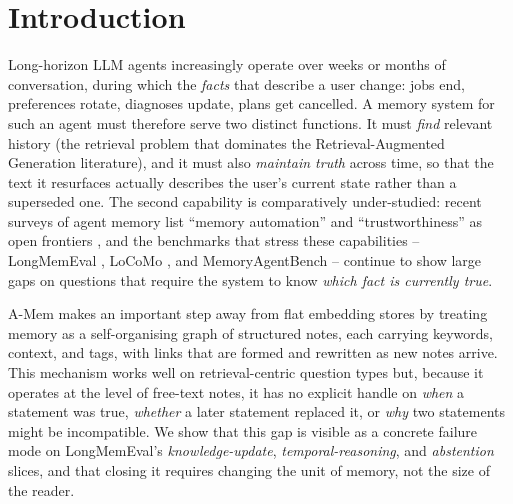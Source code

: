 \section{Introduction}
\label{sec:intro}

Long-horizon LLM agents increasingly operate over weeks or months of
conversation, during which the \emph{facts} that describe a user change:
jobs end, preferences rotate, diagnoses update, plans get cancelled.
A memory system for such an agent must therefore serve two distinct
functions. It must \emph{find} relevant history (the retrieval problem
that dominates the Retrieval-Augmented Generation literature), and it
must also \emph{maintain truth} across time, so that the text it
resurfaces actually describes the user's current state rather than a
superseded one. The second capability is comparatively under-studied:
recent surveys of agent memory list ``memory automation'' and
``trustworthiness'' as open frontiers \citep{survey_agent_memory}, and
the benchmarks that stress these capabilities -- LongMemEval
\citep{longmemeval}, LoCoMo \citep{locomo}, and MemoryAgentBench
\citep{memoryagentbench} -- continue to show large gaps on questions
that require the system to know \emph{which fact is currently true}.

A-Mem \citep{amem} makes an important step away from flat embedding
stores by treating memory as a self-organising graph of structured
notes, each carrying keywords, context, and tags, with links that are
formed and rewritten as new notes arrive. This mechanism works well on
retrieval-centric question types but, because it operates at the level
of free-text notes, it has no explicit handle on \emph{when} a
statement was true, \emph{whether} a later statement replaced it, or
\emph{why} two statements might be incompatible. We show that this gap
is visible as a concrete failure mode on LongMemEval's
\emph{knowledge-update}, \emph{temporal-reasoning}, and
\emph{abstention} slices, and that closing it requires changing the
unit of memory, not the size of the reader.

